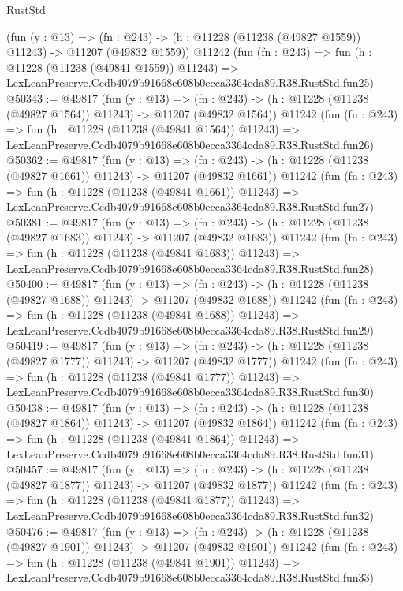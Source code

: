 \begin{lexlean}{RustStd}
\begin{coremodule}
    (fun (y : @13) =>
    (fn : @243) -> (h : @11228 (@11238 (@49827 @1559)) @11243) -> @11207 (@49832 @1559))
    @11242
    (fun (fn : @243) =>
    fun (h : @11228 (@11238 (@49841 @1559)) @11243) =>
    LexLeanPreserve.Ccdb4079b91668e608b0ecca3364cda89.R38.RustStd.fun25)
@50343 := @49817
    (fun (y : @13) =>
    (fn : @243) -> (h : @11228 (@11238 (@49827 @1564)) @11243) -> @11207 (@49832 @1564))
    @11242
    (fun (fn : @243) =>
    fun (h : @11228 (@11238 (@49841 @1564)) @11243) =>
    LexLeanPreserve.Ccdb4079b91668e608b0ecca3364cda89.R38.RustStd.fun26)
@50362 := @49817
    (fun (y : @13) =>
    (fn : @243) -> (h : @11228 (@11238 (@49827 @1661)) @11243) -> @11207 (@49832 @1661))
    @11242
    (fun (fn : @243) =>
    fun (h : @11228 (@11238 (@49841 @1661)) @11243) =>
    LexLeanPreserve.Ccdb4079b91668e608b0ecca3364cda89.R38.RustStd.fun27)
@50381 := @49817
    (fun (y : @13) =>
    (fn : @243) -> (h : @11228 (@11238 (@49827 @1683)) @11243) -> @11207 (@49832 @1683))
    @11242
    (fun (fn : @243) =>
    fun (h : @11228 (@11238 (@49841 @1683)) @11243) =>
    LexLeanPreserve.Ccdb4079b91668e608b0ecca3364cda89.R38.RustStd.fun28)
@50400 := @49817
    (fun (y : @13) =>
    (fn : @243) -> (h : @11228 (@11238 (@49827 @1688)) @11243) -> @11207 (@49832 @1688))
    @11242
    (fun (fn : @243) =>
    fun (h : @11228 (@11238 (@49841 @1688)) @11243) =>
    LexLeanPreserve.Ccdb4079b91668e608b0ecca3364cda89.R38.RustStd.fun29)
@50419 := @49817
    (fun (y : @13) =>
    (fn : @243) -> (h : @11228 (@11238 (@49827 @1777)) @11243) -> @11207 (@49832 @1777))
    @11242
    (fun (fn : @243) =>
    fun (h : @11228 (@11238 (@49841 @1777)) @11243) =>
    LexLeanPreserve.Ccdb4079b91668e608b0ecca3364cda89.R38.RustStd.fun30)
@50438 := @49817
    (fun (y : @13) =>
    (fn : @243) -> (h : @11228 (@11238 (@49827 @1864)) @11243) -> @11207 (@49832 @1864))
    @11242
    (fun (fn : @243) =>
    fun (h : @11228 (@11238 (@49841 @1864)) @11243) =>
    LexLeanPreserve.Ccdb4079b91668e608b0ecca3364cda89.R38.RustStd.fun31)
@50457 := @49817
    (fun (y : @13) =>
    (fn : @243) -> (h : @11228 (@11238 (@49827 @1877)) @11243) -> @11207 (@49832 @1877))
    @11242
    (fun (fn : @243) =>
    fun (h : @11228 (@11238 (@49841 @1877)) @11243) =>
    LexLeanPreserve.Ccdb4079b91668e608b0ecca3364cda89.R38.RustStd.fun32)
@50476 := @49817
    (fun (y : @13) =>
    (fn : @243) -> (h : @11228 (@11238 (@49827 @1901)) @11243) -> @11207 (@49832 @1901))
    @11242
    (fun (fn : @243) =>
    fun (h : @11228 (@11238 (@49841 @1901)) @11243) =>
    LexLeanPreserve.Ccdb4079b91668e608b0ecca3364cda89.R38.RustStd.fun33)

\end{coremodule}
\end{lexlean}
